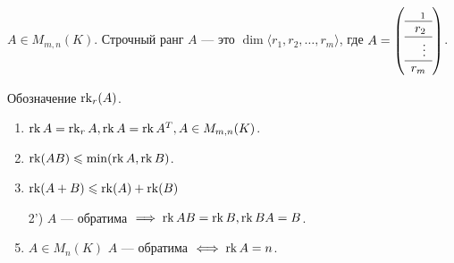 \begin{definition}
    $A \in M_{m, n}(K)$. Строчный ранг  $A$ --- это  $\dim \langle r_1, r_2, \ldots, r_m\rangle$, где $A = \left(\begin{array} r_1 \\ \hline r_2 \\ \hline \vdots \\ \hline r_m \end{array}\right)$.

        Обозначение $\operatorname{rk}_r(A)$.
\end{definition}
\begin{theorem}
    \begin{enumerate}
        \item $\operatorname{rk} A = \operatorname{rk}_r A, \operatorname{rk} A = \operatorname{rk} A^T, A \in M_{m, n}(K)$.
        \item  $\operatorname{rk} (AB) \leqslant \min(\operatorname{rk} A, \operatorname{rk} B)$.
        \item $\operatorname{rk} (A+B) \leqslant \operatorname{rk} (A) + \operatorname{rk}(B)$
        \item[2')] $A$ --- обратима $\implies \operatorname{rk} AB = \operatorname{rk} B, \operatorname{rk} BA = B$.
        \item $A \in M_n(K)$  $A$ --- обратима  $\iff \operatorname{rk} A = n$.
    \end{enumerate}
\end{theorem}
